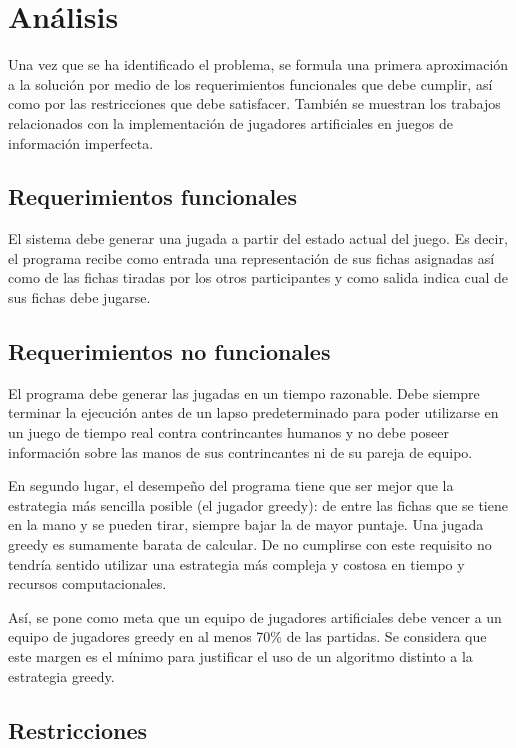 \chapter{Análisis}

\noindent
Una vez que se ha identificado el problema, se formula una primera aproximación
a la solución por medio de los requerimientos funcionales que debe cumplir, así
como por las restricciones que debe satisfacer. También se muestran los trabajos
relacionados con la implementación de jugadores artificiales en juegos de
información imperfecta.


\section{Requerimientos funcionales}

El sistema debe generar una jugada a partir del estado actual del juego. Es
decir, el programa recibe como entrada una representación de sus fichas
asignadas así como de las fichas tiradas por los otros participantes y como
salida indica cual de sus fichas debe jugarse.

\section{Requerimientos no funcionales}

El programa debe generar las jugadas en un tiempo razonable. Debe siempre
terminar la ejecución antes de un lapso predeterminado para poder utilizarse en
un juego de tiempo real contra contrincantes humanos y no debe poseer
información sobre las manos de sus contrincantes ni de su pareja de equipo.

En segundo lugar, el desempeño del programa tiene que ser mejor que la
estrategia más sencilla posible (el jugador greedy): de entre las fichas que se
tiene en la mano y se pueden tirar, siempre bajar la de mayor puntaje. Una
jugada greedy es sumamente barata de calcular. De no cumplirse con este
requisito no tendría sentido utilizar una estrategia más compleja y costosa en
tiempo y recursos computacionales.

Así, se pone como meta que un equipo de jugadores artificiales debe vencer a un
equipo de jugadores greedy en al menos 70\% de las partidas. Se considera que
este margen es el mínimo para justificar el uso de un algoritmo distinto a la
estrategia greedy.

\section{Restricciones}

